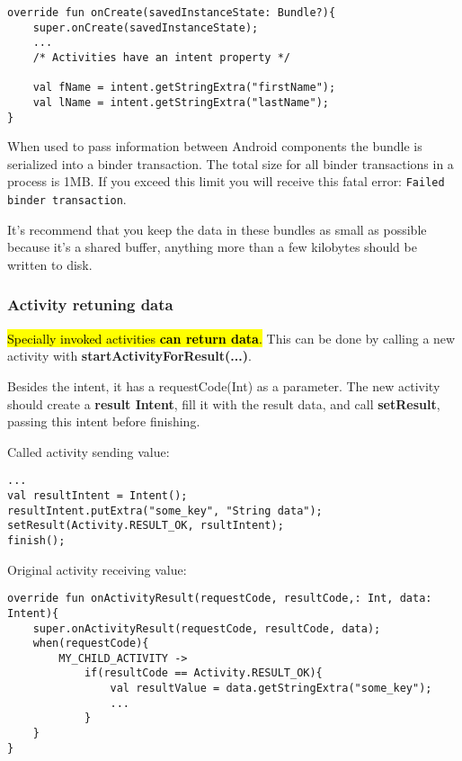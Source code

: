\begin{lstlisting}
override fun onCreate(savedInstanceState: Bundle?){
    super.onCreate(savedInstanceState);
    ...
    /* Activities have an intent property */ 

    val fName = intent.getStringExtra("firstName");
    val lName = intent.getStringExtra("lastName");
}
\end{lstlisting}

\begin{tcolorbox}[colback=red!5,colframe=red!75!black, title=Disadvantages of using Bundle]
When used to pass information between Android components the bundle is serialized 
into a binder transaction. The total size for all binder transactions in a process is 1MB. 
If you exceed this limit you will receive this fatal error: \texttt{Failed binder transaction}. 

It's recommend that you keep the data in these bundles as small as possible because 
it's a shared buffer, anything more than a few kilobytes should be written to disk.
\end{tcolorbox}

\subsubsection{Activity retuning data}
\hl{Specially invoked activities \textbf{can return data}.}
This can be done by calling a new activity with \textbf{startActivityForResult(...)}.

Besides the intent, it has a requestCode(Int) as a parameter. The new activity should create 
a \textbf{result Intent}, fill it with the result data, and call \textbf{setResult}, passing this 
intent before finishing. 

Called activity sending value: 
\begin{lstlisting}
...
val resultIntent = Intent();
resultIntent.putExtra("some_key", "String data");
setResult(Activity.RESULT_OK, rsultIntent);
finish();
\end{lstlisting}

Original activity receiving value:
\begin{lstlisting}
override fun onActivityResult(requestCode, resultCode,: Int, data: Intent){
    super.onActivityResult(requestCode, resultCode, data);
    when(requestCode){
        MY_CHILD_ACTIVITY ->
            if(resultCode == Activity.RESULT_OK){
                val resultValue = data.getStringExtra("some_key"); 
                ...
            }
    }
}
\end{lstlisting}


